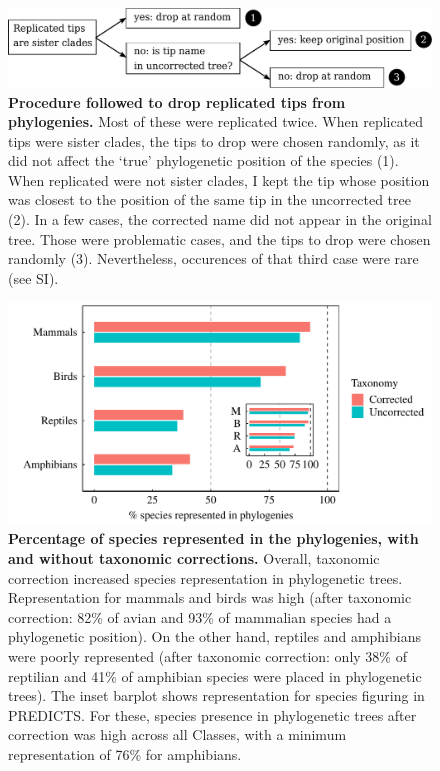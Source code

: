\begin{figure}[h!]
\centering
\includegraphics[scale=0.7]{figures/chapter2/chart_phylorep}
\caption[Procedure followed to drop replicated tips from phylogenies]{\textbf{Procedure followed to drop replicated tips from phylogenies.} Most of these were replicated twice. When replicated tips were sister clades, the tips to drop were chosen randomly, as it did not affect the `true' phylogenetic position of the species (1). When replicated were not sister clades, I kept the tip whose position was closest to the position of the same tip in the uncorrected tree (2). In a few cases, the corrected name did not appear in the original tree. Those were problematic cases, and the tips to drop were chosen randomly (3). Nevertheless, occurences of that third case were rare (see SI).}
\label{chart_phylorep}
\end{figure}

\begin{figure}[h!]
\centering
\includegraphics[scale=0.7]{figures/chapter2/Species_representation_phylo}
\caption[Percentage of species represented in the phylogenies, with and without taxonomic corrections]{\textbf{Percentage of species represented in the phylogenies, with and without taxonomic corrections.} Overall, taxonomic correction increased species representation in phylogenetic trees. Representation for mammals and birds was high (after taxonomic correction: 82\% of avian and 93\% of mammalian species had a phylogenetic position). On the other hand, reptiles and amphibians were poorly represented (after taxonomic correction: only 38\% of reptilian and 41\% of amphibian species were placed in phylogenetic trees). The inset barplot shows representation for species figuring in PREDICTS. For these, species presence in phylogenetic trees after correction was high across all Classes, with a minimum representation of 76\% for amphibians.}
\label{species_rep_phylo}
\end{figure}

